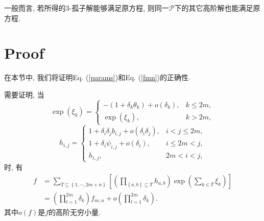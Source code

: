 \documentclass[12pt,a4paper,UTF8]{article}
\newcommand{\sbrace}[1]{\left(#1\right)}
\newcommand{\mbrace}[1]{\left[#1\right]}
\newcommand{\bbrace}[1]{\left\{#1\right\}}
\newcommand{\PS}{\mathcal{P}}
\newcommand{\refeqn}[1]{Eq. (\ref{#1})}
\begin{document}
一般而言, 若所得的3-孤子解能够满足原方程, 则同一$\PS$下的其它高阶解也能满足原方程. 

\section{Proof}\label{proof}
在本节中, 我们将证明\refeqn{params}和\refeqn{fmn}的正确性.

需要证明, 当
\begin{equation}
\exp\sbrace{\xi_k}=\left\{\begin{array}{ll}
-\sbrace{1+\delta_k \theta_k}+o\sbrace{\delta_k}, & k\le 2m, \\ 
\exp\sbrace{\xi_k}, & k>2m,   
\end{array}\right.
\end{equation}
\begin{equation}
h_{i,j}=\left\{\begin{array}{ll}
1+\delta_i \delta_j b_{i,j}+o\sbrace{\delta_i \delta_j}, & i<j\le 2m, \\
1+\delta_i \psi_{i,j}+o\sbrace{\delta_i}, & i\le 2m < j , \\
h_{i,j}, & 2m<i<j,
\end{array}\right.
\end{equation}
时, 有
\begin{equation}
\begin{aligned}
f&=\sum_{T\subseteq \bbrace{1,\cdots,2m+n}}{\mbrace{
  \sbrace{\prod_{\bbrace{a,b}\subseteq T}{h_{a,b}}}
  \exp\sbrace{\sum_{k\in T}{\xi_k}} 
}} \\ 
&=\sbrace{\prod_{l=1}^{2m}{\delta_k}}f_{m,n}+o\sbrace{\prod_{l=1}^{2m}{\delta_k}}.
\end{aligned}
\end{equation}
其中$o(f)$是$f$的高阶无穷小量.
\end{document}
